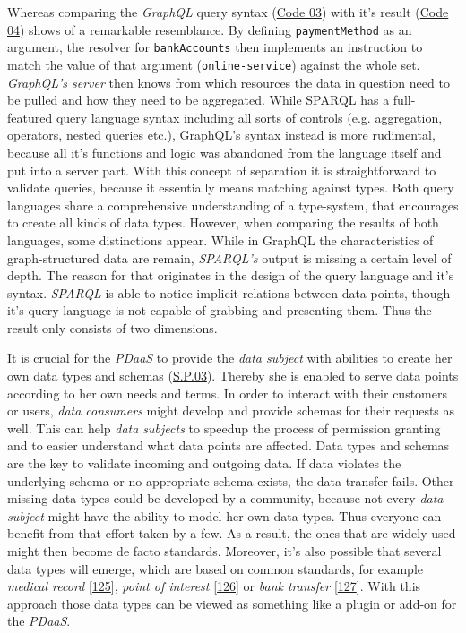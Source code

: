 \documentclass[12pt,english,a4paper,titlepage,cleardoublepage=empty,dottedtoc]{report}
\begin{document}
Whereas comparing the \emph{GraphQL} query syntax
(\protect\hyperlink{code-03_graphql-query}{Code 03}) with it's result
(\protect\hyperlink{code-04_graphql-query-result}{Code 04}) shows of a
remarkable resemblance. By defining \texttt{paymentMethod} as an
argument, the resolver for \texttt{bankAccounts} then implements an
instruction to match the value of that argument
(\texttt{\textquotesingle{}online-service\textquotesingle{}}) against
the whole set. \emph{GraphQL's server} then knows from which resources
the data in question need to be pulled and how they need to be
aggregated. While SPARQL has a full-featured query language syntax
including all sorts of controls (e.g. aggregation, operators, nested
queries etc.), GraphQL's syntax instead is more rudimental, because all
it's functions and logic was abandoned from the language itself and put
into a server part. With this concept of separation it is
straightforward to validate queries, because it essentially means
matching against types. Both query languages share a comprehensive
understanding of a type-system, that encourages to create all kinds of
data types. However, when comparing the results of both languages, some
distinctions appear. While in GraphQL the characteristics of
graph-structured data are remain, \emph{SPARQL's} output is missing a
certain level of depth. The reason for that originates in the design of
the query language and it's syntax. \emph{SPARQL} is able to notice
implicit relations between data points, though it's query language is
not capable of grabbing and presenting them. Thus the result only
consists of two dimensions.

It is crucial for the \emph{PDaaS} to provide the \emph{data subject}
with abilities to create her own data types and schemas
(\protect\hyperlink{sp03}{S.P.03}). Thereby she is enabled to serve data
points according to her own needs and terms. In order to interact with
their customers or users, \emph{data consumers} might develop and
provide schemas for their requests as well. This can help \emph{data
subjects} to speedup the process of permission granting and to easier
understand what data points are affected. Data types and schemas are the
key to validate incoming and outgoing data. If data violates the
underlying schema or no appropriate schema exists, the data transfer
fails. Other missing data types could be developed by a community,
because not every \emph{data subject} might have the ability to model
her own data types. Thus everyone can benefit from that effort taken by
a few. As a result, the ones that are widely used might then become de
facto standards. Moreover, it's also possible that several data types
will emerge, which are based on common standards, for example
\emph{medical record}
{[}\protect\hyperlink{ref-web_spec_data-schemas_ehr}{125}{]},
\emph{point of interest}
{[}\protect\hyperlink{ref-web_spec_data-schemas_poi}{126}{]} or
\emph{bank transfer}
{[}\protect\hyperlink{ref-web_spec_data-schemas_bank-transfer}{127}{]}.
With this approach those data types can be viewed as something like a
plugin or add-on for the \emph{PDaaS}.
\end{document}
